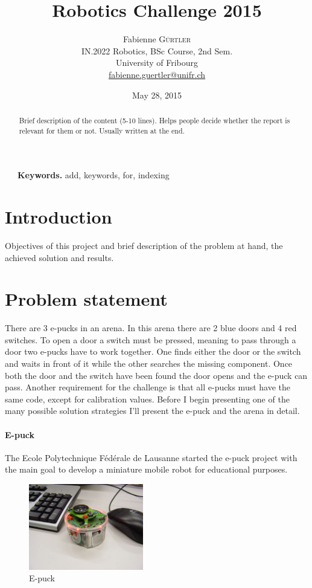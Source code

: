 \documentclass[12pt,a4paper]{article}
\title{Robotics Challenge 2015}
\date{May 28, 2015}
\author{
	Fabienne \textsc{Gürtler}\\
	IN.2022 Robotics, BSc Course, 2nd Sem.\\
	University of Fribourg \\
	\href{mailto:fabienne.guertler@unifr.ch}{fabienne.guertler@unifr.ch}
}
\begin{document}
\maketitle

\begin{abstract}
\noindent Brief description of the content (5-10 lines). Helps people decide whether the report is relevant for them or not. Usually written at the end.
\end{abstract}
~~~\indent \textbf{Keywords.} add, keywords, for, indexing

\section*{Introduction}
Objectives of this project and brief description of the problem at hand, the achieved solution and results.

\section{Problem statement}
There are 3 e-pucks in an arena. In this arena there are 2 blue doors and 4 red switches. To open a door a switch must be pressed, meaning to pass through a door two e-pucks have to work together. One finds either the door or the switch and waits in front of it while the other searches the missing component. Once both the door and the switch have been found the door opens and the e-puck can pass. Another requirement for the challenge is that all e-pucks must have the same code, except for calibration values. Before I begin presenting one of the many possible solution strategies I'll present the e-puck and the arena in detail.

\paragraph{E-puck}
The Ecole Polytechnique Fédérale de Lausanne started the e-puck project with the main goal to develop a miniature mobile robot for educational purposes. 
\begin{figure}[h!]
\begin{center}
\includegraphics[width = 5cm]{images/epuck-look.jpg}
\caption{E-puck}
\label{fig:epuck}
\end{center}
\end{figure}
\end{document}
